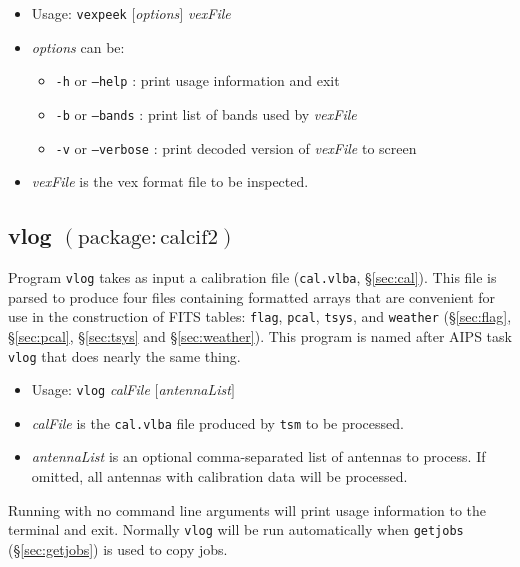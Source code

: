 \begin{itemize}
\item[] Usage: {\tt vexpeek} $[${\em options}$]$ {\em vexFile} 
\item[] {\em options} can be:
\begin{itemize}
\item[] {\tt -h} or {\tt --help} : print usage information and exit
\item[] {\tt -b} or {\tt --bands} : print list of bands used by {\em vexFile}
\item[] {\tt -v} or {\tt --verbose} : print decoded version of {\em vexFile} to screen
\end{itemize}
\item[] {\em vexFile} is the vex format file to be inspected.
\end{itemize}






\subsection{vlog {\small $\mathrm{(package: calcif2)}$}} \label{sec:vlog}

Program {\tt vlog} takes as input a calibration file ({\tt cal.vlba}, \S\ref{sec:cal}).
This file is parsed to produce four files containing formatted arrays that are convenient for use in the construction of FITS tables:
{\tt flag}, {\tt pcal}, {\tt tsys}, and {\tt weather} (\S\ref{sec:flag}, \S\ref{sec:pcal}, \S\ref{sec:tsys} and \S\ref{sec:weather}).
This program is named after AIPS task {\tt vlog} that does nearly the same thing.

\begin{itemize}
\item[] Usage: {\tt vlog} {\em calFile} $[${\em antennaList}$]$
\item[] {\em calFile} is the {\tt cal.vlba} file produced by {\tt tsm} to be processed.
\item[] {\em antennaList} is an optional comma-separated list of antennas to process.
If omitted, all antennas with calibration data will be processed.
\end{itemize}
Running with no command line arguments will print usage information to the terminal and exit.
Normally {\tt vlog} will be run automatically when {\tt getjobs} (\S\ref{sec:getjobs}) is used to copy jobs.








